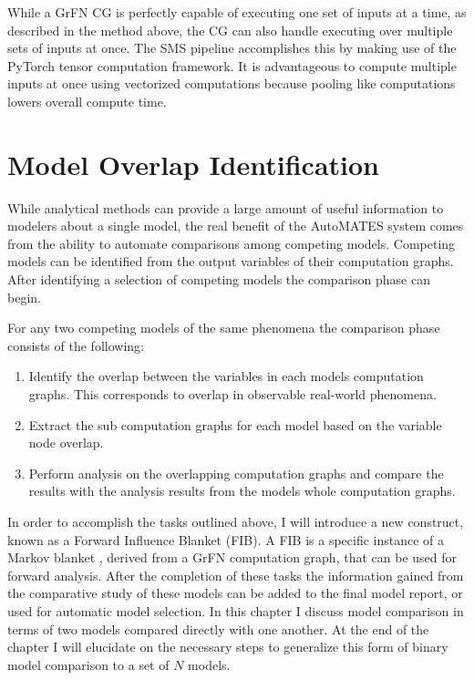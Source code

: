 While a GrFN CG is perfectly capable of executing one set of inputs at a time, as described in the method above, the CG can also handle executing over multiple sets of inputs at once.
The SMS pipeline accomplishes this by making use of the PyTorch tensor computation framework.
It is advantageous to compute multiple inputs at once using vectorized computations because pooling like computations lowers overall compute time.

\section{Model Overlap Identification\label{sec:overlap_identification}}

While analytical methods can provide a large amount of useful information to modelers about a single model, the real benefit of the AutoMATES system comes from the ability to automate comparisons among competing models. Competing models can be identified from the output variables of their computation graphs. After identifying a selection of competing models the comparison phase can begin.

For any two competing models of the same phenomena the comparison phase consists of the following:

\begin{enumerate}
  \item Identify the overlap between the variables in each models computation graphs. This corresponds to overlap in observable real-world phenomena.
  \item Extract the sub computation graphs for each model based on the variable node overlap.
  \item Perform analysis on the overlapping computation graphs and compare the results with the analysis results from the models whole computation graphs.
\end{enumerate}

In order to accomplish the tasks outlined above, I will introduce a new construct, known as a Forward Influence Blanket (FIB). A FIB is a specific instance of a Markov blanket \citep{pearl2009causality}, derived from a GrFN computation graph, that can be used for forward analysis.  %
After the completion of these tasks the information gained from the comparative study of these models can be added to the final model report, or used for automatic model selection. In this chapter I discuss model comparison in terms of two models compared directly with one another. At the end of the chapter I will elucidate on the necessary steps to generalize this form of binary model comparison to a set of $N$ models.

